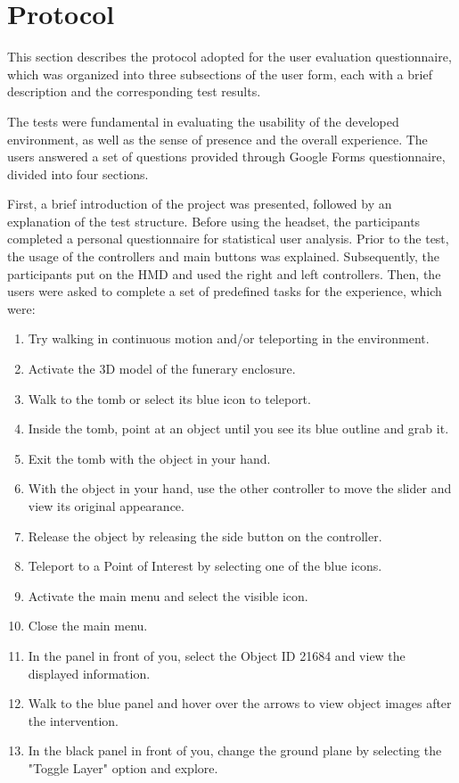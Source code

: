 \section{Protocol}
\label{sec:protocol}

This section describes the protocol adopted for the user evaluation questionnaire, which was organized into three subsections of the user form, each with a brief description and the corresponding test results.

The tests were fundamental in evaluating the usability 
of the developed environment, as well as the sense of presence 
and the overall experience. 
The users answered a set of questions provided through Google Forms questionnaire, divided into four sections. 

First, a brief introduction of the project was presented, followed by an explanation of the test structure.
Before using the headset, the participants completed a personal questionnaire for statistical user analysis. 
Prior to the test, the usage of the controllers and main buttons was explained. 
Subsequently, the participants put on the \gls{HMD} and used the right and left controllers. 
Then, the users were asked to complete a set of predefined tasks for the experience, which were:

\begin{enumerate}
\item{Try walking in continuous motion and/or teleporting in the environment.}
\item{Activate the 3D model of the funerary enclosure.}
\item{Walk to the tomb or select its blue icon to teleport.}
\item{Inside the tomb, point at an object until you see its blue outline and grab it.}
\item{Exit the tomb with the object in your hand.}
\item{With the object in your hand, use the other controller to move the slider and view its original appearance.}
\item{Release the object by releasing the side button on the controller.}
\item{Teleport to a Point of Interest by selecting one of the blue icons.}
\item{Activate the main menu and select the visible icon.}
\item{Close the main menu.}
\item{In the panel in front of you, select the Object ID 21684 and view the displayed information.}
\item{Walk to the blue panel and hover over the arrows to view object images after the intervention.}
\item{In the black panel in front of you, change the ground plane by selecting the "Toggle Layer" option and explore.}
\end{enumerate}

